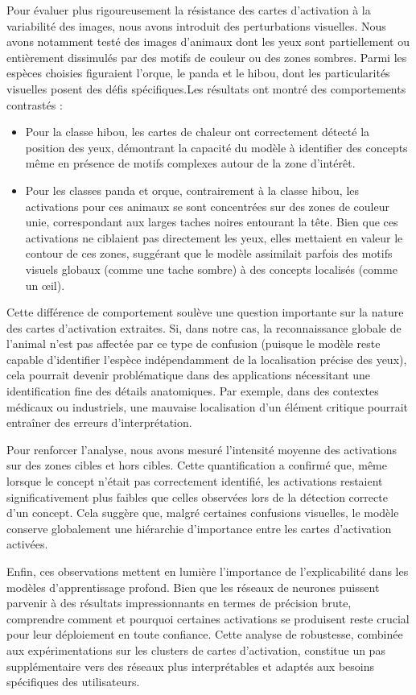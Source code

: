 \documentclass[runningheads]{llncs}
\begin{document}
Pour évaluer plus rigoureusement la résistance des cartes d'activation à la variabilité des images, nous avons introduit des perturbations visuelles. Nous avons notamment testé des images d’animaux dont les yeux sont partiellement ou entièrement dissimulés par des motifs de couleur ou des zones sombres. Parmi les espèces choisies figuraient l’orque, le panda et le hibou, dont les particularités visuelles posent des défis spécifiques.Les résultats ont montré des comportements contrastés :
\begin{itemize}
    \item Pour la classe hibou, les cartes de chaleur ont correctement détecté la position des yeux, démontrant la capacité du modèle à identifier des concepts même en présence de motifs complexes autour de la zone d’intérêt.
    \item Pour les classes panda et orque, contrairement à la classe hibou, les activations pour ces animaux se sont concentrées sur des zones de couleur unie, correspondant aux larges taches noires entourant la tête. Bien que ces activations ne ciblaient pas directement les yeux, elles mettaient en valeur le contour de ces zones, suggérant que le modèle assimilait parfois des motifs visuels globaux (comme une tache sombre) à des concepts localisés (comme un œil).
\end{itemize}
Cette différence de comportement soulève une question importante sur la nature des cartes d'activation extraites. Si, dans notre cas, la reconnaissance globale de l’animal n’est pas affectée par ce type de confusion (puisque le modèle reste capable d’identifier l’espèce indépendamment de la localisation précise des yeux), cela pourrait devenir problématique dans des applications nécessitant une identification fine des détails anatomiques. Par exemple, dans des contextes médicaux ou industriels, une mauvaise localisation d’un élément critique pourrait entraîner des erreurs d’interprétation.

Pour renforcer l’analyse, nous avons mesuré l’intensité moyenne des activations sur des zones cibles et hors cibles. Cette quantification a confirmé que, même lorsque le concept n’était pas correctement identifié, les activations restaient significativement plus faibles que celles observées lors de la détection correcte d’un concept. Cela suggère que, malgré certaines confusions visuelles, le modèle conserve globalement une hiérarchie d’importance entre les cartes d'activation activées.

Enfin, ces observations mettent en lumière l’importance de l’explicabilité dans les modèles d’apprentissage profond. Bien que les réseaux de neurones puissent parvenir à des résultats impressionnants en termes de précision brute, comprendre comment et pourquoi certaines activations se produisent reste crucial pour leur déploiement en toute confiance. Cette analyse de robustesse, combinée aux expérimentations sur les clusters de cartes d'activation, constitue un pas supplémentaire vers des réseaux plus interprétables et adaptés aux besoins spécifiques des utilisateurs.
\end{document}
